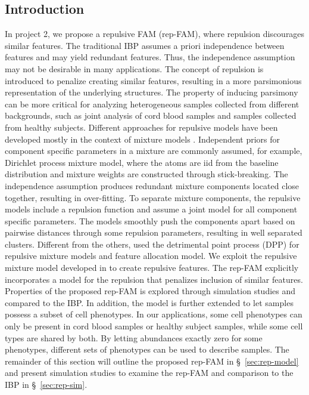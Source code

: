 \documentclass[12pt,]{article}
\begin{document}
\subsection{Introduction}
In project 2, we propose a repulsive FAM (rep-FAM), where repulsion discourages
similar features. The traditional IBP assumes a priori independence between
features and may yield redundant features. Thus, the independence assumption
may not be desirable in many applications.  The concept of repulsion is
introduced to penalize creating similar features, resulting in a more
parsimonious representation of the underlying structures.  The property of
inducing parsimony can be more critical for analyzing heterogeneous samples
collected from different backgrounds, such as joint analysis of cord blood
samples and samples collected from healthy subjects.  Different approaches for
repulsive models have been developed mostly in the context of mixture models
\citep{petralia2012repulsive, quinlan2017parsimonious, xie2017bayesian,
quinlan2017density}.  Independent priors for component specific parameters in a
mixture are commonly assumed, for example, Dirichlet process mixture model,
where the atoms are iid from the baseline distribution and mixture weights are
constructed through stick-breaking. The independence assumption produces
redundant mixture components located close together, resulting in over-fitting.
To separate mixture components, the repulsive models include a repulsion
function and assume a joint model for all component specific parameters.  The
models smoothly push the components apart based on pairwise distances through
some repulsion parameters, resulting in well separated clusters.  Different
from the others, \cite{xu2016bayesian} used the detrimental point process
(DPP) for repulsive mixture models and feature allocation model.  We exploit
the repulsive mixture model developed in \cite{quinlan2017density} to create
repulsive features.  The rep-FAM explicitly incorporates a model for the
repulsion that penalizes inclusion of similar features. Properties of the
proposed rep-FAM is explored through simulation studies and compared to the
IBP.   In addition, the model is further extended to let samples possess a
subset of cell phenotypes. In our applications, some cell phenotypes can only
be present in cord blood samples or healthy subject samples, while some cell
types are shared by both.  By letting abundances exactly zero for some
phenotypes, different sets of phenotypes can be used to describe samples.  The
remainder of this section will outline the proposed rep-FAM in
\S~\ref{sec:rep-model} and present simulation studies to examine the rep-FAM
and comparison to the IBP in \S~\ref{sec:rep-sim}.
\end{document}
